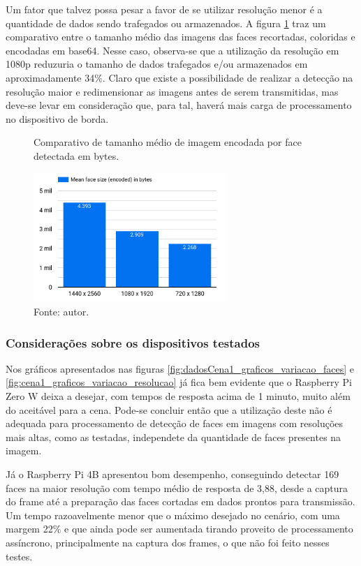 Um fator que talvez possa pesar a favor de se utilizar resolução menor é a quantidade de dados sendo trafegados ou armazenados. A figura \ref{fig:cena1_comparativo_tamanho_faces} traz um comparativo entre o tamanho médio das imagens das faces recortadas, coloridas e encodadas em base64. Nesse caso, observa-se que a utilização da resolução em 1080p reduzuria o tamanho de dados trafegados e/ou armazenados em aproximadamente 34\%. Claro que existe a possibilidade de realizar a detecção na resolução maior e redimensionar as imagens antes de serem transmitidas, mas deve-se levar em consideração que, para tal, haverá mais carga de processamento no dispositivo de borda.

\begin{figure}[h]
    \centering
    \caption[Comparativo de tamanho médio de imagem encodada por face detectada em bytes.]{Comparativo de tamanho médio de imagem encodada por face detectada em bytes.}
    \includegraphics[width=0.65\textwidth]{Cap4_Experimentos_Realizados/Figures/cena1_graficos_tamanho_medio_imagem_face.jpg}
    \caption*{Fonte: autor.}
    \label{fig:cena1_comparativo_tamanho_faces}
\end{figure}

\subsubsection{Considerações sobre os dispositivos testados}
Nos gráficos apresentados nas figuras \ref{fig:dadosCena1_graficos_variacao_faces} e \ref{fig:cena1_graficos_variacao_resolucao} já fica bem evidente que o Raspberry Pi Zero W deixa a desejar, com tempos de resposta acima de 1 minuto, muito além do aceitável para a cena. Pode-se concluir então que a utilização deste não é adequada para processamento de detecção de faces em imagens com resoluções mais altas, como as testadas, independete da quantidade de faces presentes na imagem.

Já o Raspberry Pi 4B apresentou bom desempenho, conseguindo detectar 169 faces na maior resolução com tempo médio de resposta de 3,88, desde a captura do frame até a preparação das faces cortadas em dados prontos para transmissão. Um tempo razoavelmente menor que o máximo desejado no cenário, com uma margem 22\% e que ainda pode ser aumentada tirando proveito de processamento assíncrono, principalmente na captura dos frames, o que não foi feito nesses testes.


